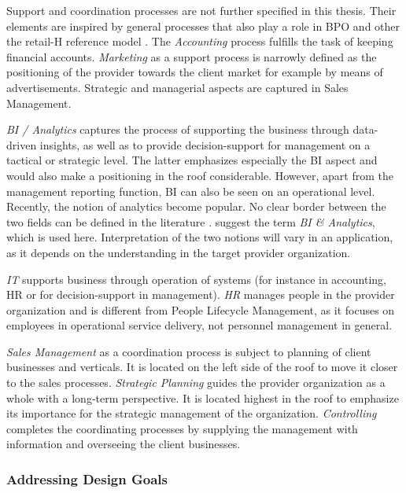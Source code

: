 	 Support and coordination processes are not further specified in this thesis. Their elements are inspired by general processes that also play a role in \acrshort{BPO} and other the retail-H reference model \cite{becker2004handelsinformationssysteme}. The \textit{Accounting} process fulfills the task of keeping financial accounts. \textit{Marketing} as a support process is narrowly defined as the positioning of the provider towards the client market for example by means of advertisements. Strategic and managerial aspects are captured in Sales Management. 
	 
	 \textit{ \acrfull{BI} / Analytics} captures the process of supporting the business through data-driven insights, as well as to provide decision-support for management on a tactical or strategic level. The latter emphasizes especially the \acrshort{BI} aspect and would also make a positioning in the roof considerable. However, apart from the management reporting function, \acrshort{BI} can also be seen on an operational level. Recently, the notion of analytics become popular. No clear border between the two fields can be defined in the literature \citep{mertens}. \cite{Chen:2012:BIA} suggest the term \textit{\acrshort{BI} \& Analytics}, which is used here. Interpretation of the two notions will vary in an application, as it depends on the understanding in the target provider organization. 
	  
	  \textit{IT} supports business through operation of systems (for instance in accounting, HR or for decision-support in management). \textit{HR} manages people in the provider organization and is different from People Lifecycle Management, as it focuses on  employees in operational service delivery, not personnel management in general. 
	  
	  \textit{Sales Management} as a coordination process is subject to planning of client businesses and verticals. It is located on the left side of the roof to move it closer to the sales processes. \textit{Strategic Planning} guides the provider organization as a whole with a long-term perspective. It is located highest in the roof to emphasize its importance for the strategic management of the organization. \textit{Controlling} completes the coordinating processes by supplying the management with information and overseeing the client businesses. 
	 	 
	 \subsubsection{Addressing  Design Goals}
	 
